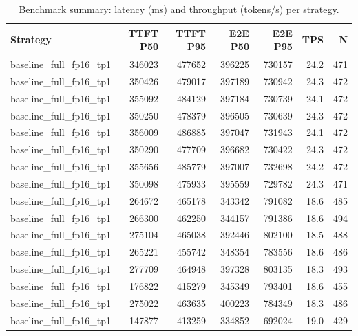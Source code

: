 \begin{table}
\caption{Benchmark summary: latency (ms) and throughput (tokens/s) per strategy.}
\label{tab:summary}
\begin{tabular}{lrrrrrr}
\toprule
Strategy & TTFT P50 & TTFT P95 & E2E P50 & E2E P95 & TPS & N \\
\midrule
baseline_full_fp16_tp1 & 346023 & 477652 & 396225 & 730157 & 24.2 & 471 \\
baseline_full_fp16_tp1 & 350426 & 479017 & 397189 & 730942 & 24.3 & 472 \\
baseline_full_fp16_tp1 & 355092 & 484129 & 397184 & 730739 & 24.1 & 472 \\
baseline_full_fp16_tp1 & 350250 & 478379 & 396505 & 730639 & 24.3 & 472 \\
baseline_full_fp16_tp1 & 356009 & 486885 & 397047 & 731943 & 24.1 & 472 \\
baseline_full_fp16_tp1 & 350290 & 477709 & 396682 & 730422 & 24.3 & 472 \\
baseline_full_fp16_tp1 & 355656 & 485779 & 397007 & 732698 & 24.2 & 472 \\
baseline_full_fp16_tp1 & 350098 & 475933 & 395559 & 729782 & 24.3 & 471 \\
baseline_full_fp16_tp1 & 264672 & 465178 & 343342 & 791082 & 18.6 & 485 \\
baseline_full_fp16_tp1 & 266300 & 462250 & 344157 & 791386 & 18.6 & 494 \\
baseline_full_fp16_tp1 & 275104 & 465038 & 392446 & 802100 & 18.5 & 488 \\
baseline_full_fp16_tp1 & 265221 & 455742 & 348354 & 783556 & 18.6 & 486 \\
baseline_full_fp16_tp1 & 277709 & 464948 & 397328 & 803135 & 18.3 & 493 \\
baseline_full_fp16_tp1 & 176822 & 415279 & 345349 & 793401 & 18.6 & 455 \\
baseline_full_fp16_tp1 & 275022 & 463635 & 400223 & 784349 & 18.3 & 486 \\
baseline_full_fp16_tp1 & 147877 & 413259 & 334852 & 692024 & 19.0 & 429 \\
\bottomrule
\end{tabular}
\end{table}
